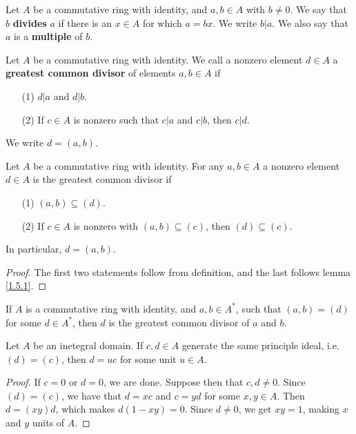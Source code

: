 \begin{definition}
    Let $A$ be a commutative ring with identity, and  $a,b \in A$ with $b \neq 0$.
    We say that $b$ \textbf{divides} $a$ if there is an  $x \in A$ for which  $a=bx$.
    We write  $b|a$. We also say that $a$ is a \textbf{multiple} of $b$.
\end{definition}

\begin{definition}
    Let $A$ be a commutative ring with identity. We call a nonzero element
    $d \in A$ a \textbf{greatest common divisor} of elements $a,b \in A$ if
    \begin{enumerate}
        \item[(1)] $d|a$ and  $d|b$.

        \item[(2)] If $c \in A$ is nonzero such that  $c|a$ and  $c|b$, then
            $c|d$.
    \end{enumerate}
    We write $d=(a,b)$.
\end{definition}

\begin{lemma}\label{1.5.2}
    Let $A$ be a commutative ring with identity. For any $a,b \in A$ a nonzero
    element $d \in A$ is the greatest common divisor if
    \begin{enumerate}
        \item[(1)] $(a,b) \subseteq (d)$.

        \item[(2)] If $c \in A$ is nonzero with $(a,b) \subseteq (c)$, then $(d)
            \subseteq (c)$.
    \end{enumerate}
    In particular, $d=(a,b)$.
\end{lemma}
\begin{proof}
    The first two statements follow from definition, and the last follows lemma
    \ref{1.5.1}.
\end{proof}

\begin{lemma}\label{1.5.3}
    If $A$ is a commutative ring with identity, and $a,b \in A^\ast$, such that
    $(a,b)=(d)$ for some $d \in A^\ast$, then $d$ is the greatest common divisor
    of $a$ and $b$.
\end{lemma}

\begin{lemma}\label{1.5.4}
    Let $A$ be an inetegral domain. If $c,d \in A$ generate the same principle
    ideal, i.e. $(d)=(c)$, then $d=uc$ for some unit  $u \in A$.
\end{lemma}
\begin{proof}
    If $c=0$ or  $d=0$, we are done. Suppose then that  $c,d \neq 0$. Since
    $(d)=(c)$, we have that $d=xc$ and $c=yd$ for some  $x,y \in A$. Then
    $d=(xy)d$, which makes $d(1-xy)=0$. Since $d \neq 0$, we get $xy=1$, making
     $x$ and $y$ units of $A$.
\end{proof}

